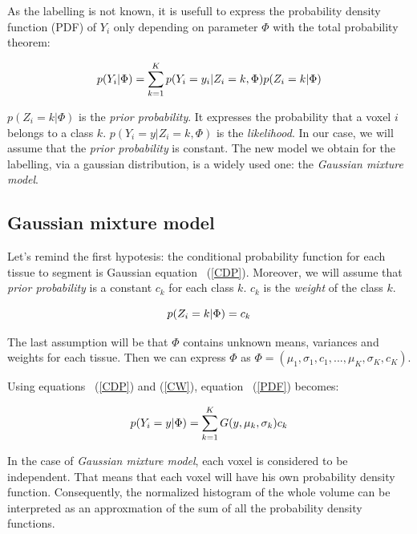 \par
As the labelling is not known, it is usefull to express the probability density function (PDF) of $Y_i$ only depending on parameter $\Phi$ with the total probability theorem:

  \begin{equation}\label{PDF}
  p(Y_i|\Phi)=\sum_{k=1}^K p(Y_i=y_i|Z_i=k,\Phi)p(Z_i=k|\Phi)\\
  \end{equation}

\par
$p(Z_i=k|\Phi)$ is the \textit{prior probability}. It expresses the probability that a voxel $i$ belongs to a class $k$. $p(Y_i=y|Z_i=k,\Phi)$ is the \textit{likelihood}. In our case, we will assume that the \textit{prior probability} is constant. The new model we obtain for the labelling, via a gaussian distribution,  is a widely used one: the \textit{Gaussian mixture model}.
%
\subsection{Gaussian mixture model}
Let's remind the first hypotesis: the conditional probability function for each tissue to segment is Gaussian equation ~(\ref{CDP}). Moreover, we will assume that \textit{prior probability} is a constant $c_k$ for each class $k$. $c_k$ is the \textit{weight} of the class $k$.
  
  \begin{equation}\label{CW}
  p(Z_i=k|\Phi)=c_k\\
  \end{equation}

The last assumption will be that $\Phi$ contains unknown means, variances and weights for each tissue. Then we can express $\Phi$ as $\Phi=(\mu_1, \sigma_1, c_1, ..., \mu_K, \sigma_K, c_K)$.
\par
Using equations ~(\ref{CDP}) and (\ref{CW}), equation ~(\ref{PDF}) becomes:
 
  \begin{equation}\label{GMM}
  p(Y_i=y|\Phi)=\sum_{k=1}^K G(y,\mu_k,\sigma_k)c_k\\
  \end{equation}

\par
In the case of \textit{Gaussian mixture model}, each voxel is considered to be independent. That means that each voxel will have his own probability density function. Consequently, the normalized histogram of the whole volume can be interpreted as an approxmation of the sum of all the probability density functions. %
%
